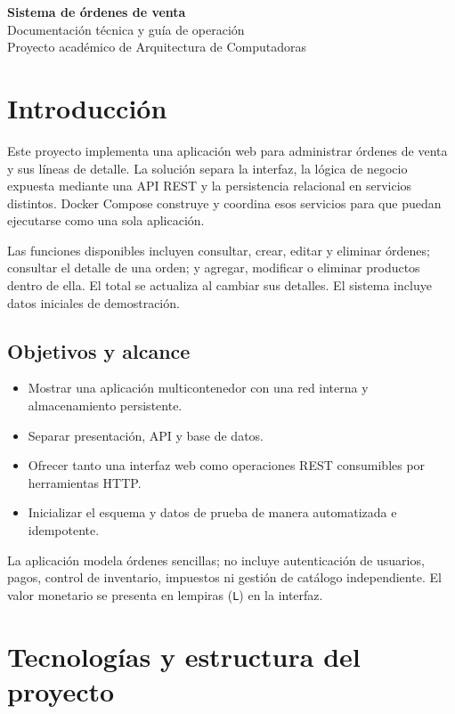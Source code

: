 \documentclass[11pt,a4paper]{article}
\begin{document}
\begin{center}
    {\LARGE\bfseries\color{azul} Sistema de órdenes de venta}\\[4pt]
    {\large Documentación técnica y guía de operación}\\[6pt]
    {\color{gristexto} Proyecto académico de Arquitectura de Computadoras}
\end{center}

\tableofcontents
\clearpage

\section{Introducción}

Este proyecto implementa una aplicación web para administrar órdenes de venta y sus líneas de detalle. La solución separa la interfaz, la lógica de negocio expuesta mediante una API REST y la persistencia relacional en servicios distintos. Docker Compose construye y coordina esos servicios para que puedan ejecutarse como una sola aplicación.

Las funciones disponibles incluyen consultar, crear, editar y eliminar órdenes; consultar el detalle de una orden; y agregar, modificar o eliminar productos dentro de ella. El total se actualiza al cambiar sus detalles. El sistema incluye datos iniciales de demostración.

\subsection{Objetivos y alcance}
\begin{itemize}
    \item Mostrar una aplicación multicontenedor con una red interna y almacenamiento persistente.
    \item Separar presentación, API y base de datos.
    \item Ofrecer tanto una interfaz web como operaciones REST consumibles por herramientas HTTP.
    \item Inicializar el esquema y datos de prueba de manera automatizada e idempotente.
\end{itemize}

La aplicación modela órdenes sencillas; no incluye autenticación de usuarios, pagos, control de inventario, impuestos ni gestión de catálogo independiente. El valor monetario se presenta en lempiras (\texttt{L}) en la interfaz.

\section{Tecnologías y estructura del proyecto}
\end{document}
